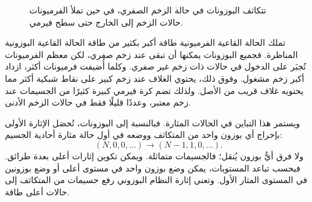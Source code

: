 \begin{figure}
\centering
{}
\caption{تتكاثف البوزونات في حالة الزخم الصفري، في حين تملأ الفرميونات حالات الزخم إلى الخارج حتى سطح فيرمي.}
\end{figure}

تملك الحالة القاعية الفرميونية طاقة أكبر بكثير من طاقة الحالة القاعية البوزونية المناظرة. فجميع البوزونات يمكنها أن تبقى عند زخم صفري، لكن معظم الفرميونات تُجبَر على الدخول في حالات ذات زخم غير صفري. وكلما أُضيفت فرميونات أكثر، ازداد أكبر زخم مشغول. وفوق ذلك، يحتوي الغلاف عند زخم كبير على نقاط شبكية أكثر مما يحتويه غلاف قريب من الأصل. ولذلك تضم كرة فيرمي كبيرة كثيرًا من الجسيمات عند زخم معتبر، وعددًا قليلًا فقط في حالات الزخم الأدنى.

ويستمر هذا التباين في الحالات المثارة. فبالنسبة إلى البوزونات، تُحصَل الإثارة الأولى بإخراج أي بوزون واحد من المتكاثف ووضعه في أول حالة مثارة أحادية الجسيم:
\begin{equation}
(N,0,0,\ldots)\longrightarrow (N-1,1,0,\ldots).
\end{equation}
ولا فرق أيُّ بوزون يُنقل؛ فالجسيمات متماثلة. ويمكن تكوين إثارات أعلى بعدة طرائق. فبحسب تباعد المستويات، يمكن وضع بوزون واحد في مستوى أعلى أو وضع بوزونين في المستوى المثار الأول. وتعني إثارة النظام البوزوني رفع جسيمات من المتكاثف إلى حالات أعلى طاقة.

